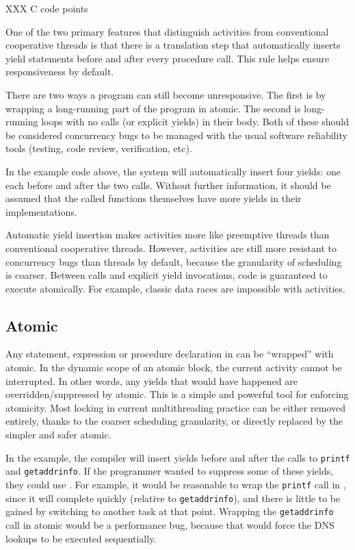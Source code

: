 \documentclass[acmsmall,anonymous,review]{acmart}\settopmatter{printfolios=true,printccs=false,printacmref=false}
\begin{document}
XXX C code points

One of the two primary features that distinguish activities from conventional cooperative threads is that there is a translation step that automatically inserts yield statements before and after every procedure call.
This rule helps ensure responsiveness by default.

There are two ways a program can still become unresponsive.
The first is by wrapping a long-running part of the program in atomic.
The second is long-running loops with no calls (or explicit yields) in their body.
Both of these should be considered concurrency bugs to be managed with the usual software reliability tools (testing, code review, verification, etc).

In the example code above, the system will automatically insert four yields: one each before and after the two calls.
Without further information, it should be assumed that the called functions themselves have more yields in their implementations.

Automatic yield insertion makes activities more like preemptive threads than conventional cooperative threads.
However, activities are still more resistant to concurrency bugs than threads by default, because the granularity of scheduling is coarser.
Between calls and explicit yield invocations, code is guaranteed to execute atomically.
For example, classic data races are impossible with activities.

\subsection{Atomic}
\label{sec:atomic}

Any statement, expression or procedure declaration in \charcoal{} can be ``wrapped'' with atomic.
In the dynamic scope of an atomic block, the current activity cannot be interrupted.
In other words, any yields that would have happened are overridden/suppressed by atomic.
This is a simple and powerful tool for enforcing atomicity.
Most locking in current multithreading practice can be either removed entirely, thanks to the coarser scheduling granularity, or directly replaced by the simpler and safer atomic.

In the example, the compiler will insert yields before and after the calls to \texttt{printf} and \texttt{getaddrinfo}.
If the programmer wanted to suppress some of these yields, they could use \atomic{}.
For example, it would be reasonable to wrap the \texttt{printf} call in \atomic{}, since it will complete quickly (relative to \texttt{getaddrinfo}), and there is little to be gained by switching to another task at that point.
Wrapping the \texttt{getaddrinfo} call in atomic would be a performance bug, because that would force the DNS lookups to be executed sequentially.
\end{document}
